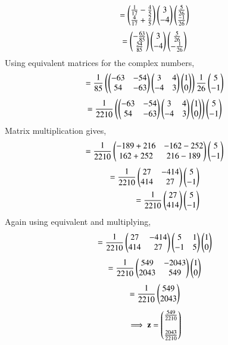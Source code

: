 \documentclass[journal,12pt,twocolumn]{IEEEtran}
\begin{document}
\begin{align}
    = \begin{pmatrix}\frac{1}{17} - \frac{4}{5} \\  \frac{4}{17} + \frac{2}{5}\end{pmatrix}  \begin{pmatrix}3 \\ -4\end{pmatrix} \begin{pmatrix}\frac{5}{26}  \\  \frac{-1}{26}\end{pmatrix}
\end{align}
\begin{align}
    = \begin{pmatrix}-\frac{63}{85} \\ \frac{54}{85}\end{pmatrix}\begin{pmatrix}3 \\ -4\end{pmatrix}\begin{pmatrix} \frac{5}{26} \\ - \frac{1}{26}\end{pmatrix}
\end{align}
Using equivalent matrices for the complex numbers,
\begin{align}
   = \frac{1}{85}\left(\begin{pmatrix}-63 & -54 \\ 54 & -63\end{pmatrix} \begin{pmatrix}3 & 4 \\-4 & 3\end{pmatrix} \begin{pmatrix}1 \\ 0\end{pmatrix} \right) \frac{1}{26}\begin{pmatrix}5 \\ -1\end{pmatrix}
\end{align}
\begin{align}
     = \frac{1}{2210}\left(\begin{pmatrix}-63 & -54 \\ 54 & -63\end{pmatrix} \begin{pmatrix}3 & 4 \\-4 & 3\end{pmatrix} \begin{pmatrix}1 \\ 0\end{pmatrix} \right)\begin{pmatrix}5 \\ -1\end{pmatrix} 
\end{align}
Matrix multiplication gives,
\begin{align}
    = \frac{1}{2210}\begin{pmatrix}-189+216 & -162-252 \\ 162+252 & 216-189\end{pmatrix}\begin{pmatrix}5 \\ -1\end{pmatrix}
\end{align}
\begin{align}
   =\frac{1}{2210}\begin{pmatrix}27 & -414 \\ 414 & 27\end{pmatrix}\begin{pmatrix}5 \\ -1\end{pmatrix} \\
    = \frac{1}{2210}\begin{pmatrix}27 \\ 414\end{pmatrix} \begin{pmatrix}5 \\ -1\end{pmatrix} 
\end{align}
Again using equivalent and multiplying,
\begin{align}
    =  \frac{1}{2210}\begin{pmatrix} 27 & -414 \\  414 & 27\end{pmatrix} \begin{pmatrix}5 & 1 \\ -1 & 5\end{pmatrix}\begin{pmatrix}1 \\ 0\end{pmatrix} 
\end{align}
\begin{align}
    = \frac{1}{2210}\begin{pmatrix}549 & -2043 \\ 2043 & 549\end{pmatrix}\begin{pmatrix}1 \\ 0\end{pmatrix}
\end{align}
\begin{align}
    = \frac{1}{2210}\begin{pmatrix}549 \\ 2043\end{pmatrix}
\end{align}
\begin{align}
    \implies\mathbf{z} = \begin{pmatrix}\frac{549}{2210} \\ \\ \frac{2043}{2210}\end{pmatrix}
\end{align}
\end{document}
